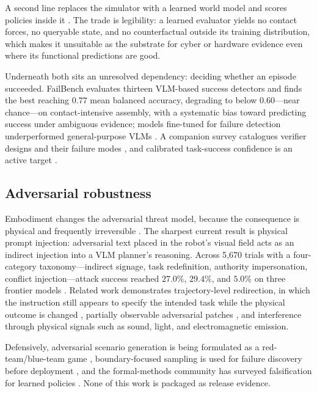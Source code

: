 \documentclass[11pt]{article}
\theoremstyle{definition}
\begin{document}
A second line replaces the simulator with a learned world model and scores policies inside
it \citep{onexwm,gigaworld,dworldeval}. The trade is legibility: a learned evaluator yields
no contact forces, no queryable state, and no counterfactual outside its training
distribution, which makes it unsuitable as the substrate for cyber or hardware evidence even
where its functional predictions are good.

Underneath both sits an unresolved dependency: deciding whether an episode succeeded.
FailBench evaluates thirteen VLM-based success detectors and finds the best reaching $0.77$
mean balanced accuracy, degrading to below $0.60$---near chance---on contact-intensive
assembly, with a systematic bias toward predicting success under ambiguous evidence; models
fine-tuned for failure detection underperformed general-purpose VLMs \citep{failbench}. A
companion survey catalogues verifier designs and their failure modes \citep{nofreechecker},
and calibrated task-success confidence is an active target \citep{vlaconf}.

\subsection{Adversarial robustness}

Embodiment changes the adversarial threat model, because the consequence is physical and
frequently irreversible \citep{vlasafety}. The sharpest current result is physical prompt
injection: adversarial text placed in the robot's visual field acts as an indirect injection
into a VLM planner's reasoning. Across 5{,}670 trials with a four-category
taxonomy---indirect signage, task redefinition, authority impersonation, conflict
injection---attack success reached $27.0\%$, $29.4\%$, and $5.0\%$ on three frontier models
\citep{paperhijack}. Related work demonstrates trajectory-level redirection, in which the
instruction still appears to specify the intended task while the physical outcome is changed
\citep{trajredirect}, partially observable adversarial patches \citep{patchattack}, and
interference through physical signals such as sound, light, and electromagnetic emission.

Defensively, adversarial scenario generation is being formulated as a red-team/blue-team
game \citep{advsynth}, boundary-focused sampling is used for failure discovery before
deployment \citep{robogate}, and the formal-methods community has surveyed falsification for
learned policies \citep{formalsurvey}. None of this work is packaged as release evidence.
\end{document}

